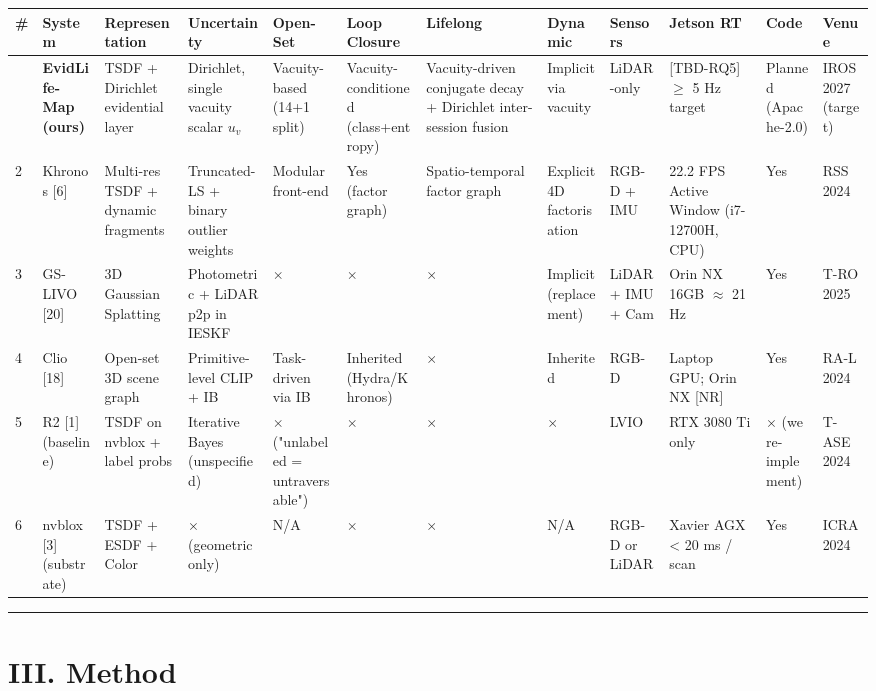 \documentclass[
]{article}
\newcounter{none} %
\begin{document}
{\def\LTcaptype{none} %
\begin{longtable}[]{@{}llllllllllll@{}}
\toprule\noalign{}
\# & System & Representation & Uncertainty & Open-Set & Loop Closure &
Lifelong & Dynamic & Sensors & Jetson RT & Code & Venue \\
\midrule\noalign{}
\endhead
\bottomrule\noalign{}
\endlastfoot
1 & \textbf{EvidLife-Map (ours)} & TSDF + Dirichlet evidential layer &
Dirichlet, single vacuity scalar \(u_v\) & Vacuity-based (14+1 split) &
Vacuity-conditioned (class+entropy) & Vacuity-driven conjugate decay +
Dirichlet inter-session fusion & Implicit via vacuity & LiDAR-only &
{[}TBD-RQ5{]} \(\ge\) 5 Hz target & Planned (Apache-2.0) & IROS 2027
(target) \\
2 & Khronos {[}6{]} & Multi-res TSDF + dynamic fragments & Truncated-LS
+ binary outlier weights & Modular front-end & Yes (factor graph) &
Spatio-temporal factor graph & Explicit 4D factorisation & RGB-D + IMU &
22.2 FPS Active Window (i7-12700H, CPU) & Yes & RSS 2024 \\
3 & GS-LIVO {[}20{]} & 3D Gaussian Splatting & Photometric + LiDAR p2p
in IESKF & \(\times\) & \(\times\) & \(\times\) & Implicit (replacement)
& LiDAR + IMU + Cam & Orin NX 16GB \(\approx\) 21 Hz & Yes & T-RO
2025 \\
4 & Clio {[}18{]} & Open-set 3D scene graph & Primitive-level CLIP + IB
& Task-driven via IB & Inherited (Hydra/Khronos) & \(\times\) &
Inherited & RGB-D & Laptop GPU; Orin NX {[}NR{]} & Yes & RA-L 2024 \\
5 & R2 {[}1{]} (baseline) & TSDF on nvblox + label probs & Iterative
Bayes (unspecified) & \(\times\) ("unlabeled = untraversable") &
\(\times\) & \(\times\) & \(\times\) & LVIO & RTX 3080 Ti only &
\(\times\) (we re-implement) & T-ASE 2024 \\
6 & nvblox {[}3{]} (substrate) & TSDF + ESDF + Color & \(\times\)
(geometric only) & N/A & \(\times\) & \(\times\) & N/A & RGB-D or LiDAR
& Xavier AGX \textless{} 20 ms / scan & Yes & ICRA 2024 \\
\end{longtable}
}

\begin{center}\rule{0.5\linewidth}{0.5pt}\end{center}

\section{III. Method}\label{iii-method}
\end{document}
